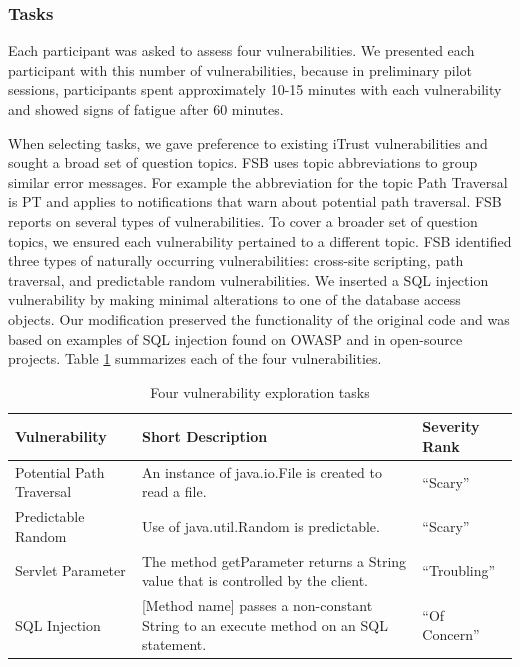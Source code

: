 \documentclass{acm_proc_article-sp}
\begin{document}
\subsubsection{Tasks}
Each participant was asked to assess four vulnerabilities. 
We presented each participant with this number of vulnerabilities, because in preliminary pilot sessions, participants spent approximately 10-15 minutes with each vulnerability and showed signs of fatigue after 60 minutes.

When selecting tasks, we gave preference to existing iTrust vulnerabilities and sought a broad set of question topics.  
FSB uses topic abbreviations to group similar error messages. 
For example the abbreviation for the topic Path Traversal is PT and applies to notifications that warn about potential path traversal. 
FSB reports on several types of vulnerabilities. 
To cover a broader set of question topics, we ensured each vulnerability pertained to a different topic.
FSB identified three types of naturally occurring vulnerabilities: cross-site scripting, path traversal, and predictable random vulnerabilities.
We inserted a SQL injection vulnerability by making minimal alterations to one of the database access objects.
Our modification preserved the functionality of the original code and was based on examples of SQL injection found on OWASP and in open-source projects.
Table \ref{table:vulnerabilities} summarizes each of the four vulnerabilities. 

\begin{table} 
\centering
\caption{Four vulnerability exploration tasks}
\begin{tabular}{|l|l|l|}
\rowcolor{gray!50}
\hline
    Vulnerability				& Short Description													& Severity Rank 	\\
    \hline	
    Potential Path Traversal	& An instance of java.io.File is created to read a file.     			& ``Scary''	    \\
    \hline
    Predictable Random			& Use of java.util.Random is predictable. 								& ``Scary''		\\
    \hline
    Servlet Parameter 			& The method getParameter returns a String value that is controlled by the client.			& ``Troubling''	\\
    \hline
    SQL Injection				& [Method name] passes a non-constant String to an execute method on an SQL statement.     	& ``Of Concern'' \\
    \hline
\end{tabular}
\label{table:vulnerabilities}
\end{table}
\end{document}
